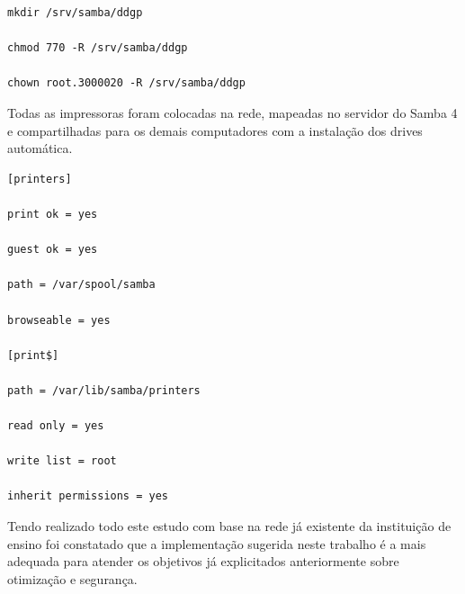 \begin{lstlisting}
mkdir /srv/samba/ddgp

chmod 770 -R /srv/samba/ddgp

chown root.3000020 -R /srv/samba/ddgp
\end{lstlisting}

Todas as impressoras foram colocadas na rede, mapeadas no servidor do Samba 4 e compartilhadas para os demais computadores com a instalação dos drives automática.\\

\begin{lstlisting}
[printers] 

print ok = yes 

guest ok = yes

path = /var/spool/samba 

browseable = yes

[print$] 

path = /var/lib/samba/printers 

read only = yes

write list = root 

inherit permissions = yes
\end{lstlisting}

Tendo realizado todo este estudo com base na rede já existente da instituição de ensino foi constatado que a implementação sugerida neste trabalho é a mais adequada para atender os objetivos já explicitados anteriormente sobre otimização e segurança.

